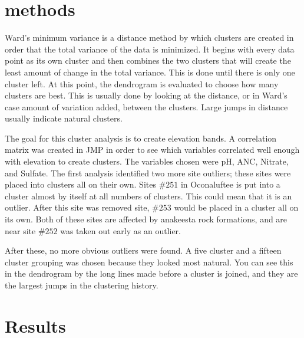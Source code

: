 \section{methods}
Ward’s minimum variance is a distance method by which clusters are created in order that the total variance of the data is minimized.  It begins with every data point as its own cluster and then combines the two clusters that will create the least amount of change in the total variance.  This is done until there is only one cluster left.  At this point, the dendrogram is evaluated to choose how many clusters are best.  This is usually done by looking at the distance, or in Ward’s case amount of variation added, between the clusters.  Large jumps in distance usually indicate natural clusters.

The goal for this cluster analysis is to create elevation bands.  A correlation matrix was created in JMP in order to see which variables correlated well enough with elevation to create clusters.  The variables chosen were pH, ANC, Nitrate, and Sulfate.   The first analysis identified two more site outliers; these sites were placed into clusters all on their own.  Sites $\#251$ in Oconaluftee is put into a cluster almost by itself at all numbers of clusters.  This could mean that it is an outlier.  After this site was removed site, $\#253$ would be placed in a cluster all on its own.  Both of these sites are affected by anakeesta rock formations, and are near site $\#252$ was taken out early as an outlier.

After these, no more obvious outliers were found.  A five cluster and a fifteen cluster grouping was chosen because they looked most natural.  You can see this in the dendrogram by the long lines made before a cluster is joined, and they are the largest jumps in the clustering history.

\section{Results}%

